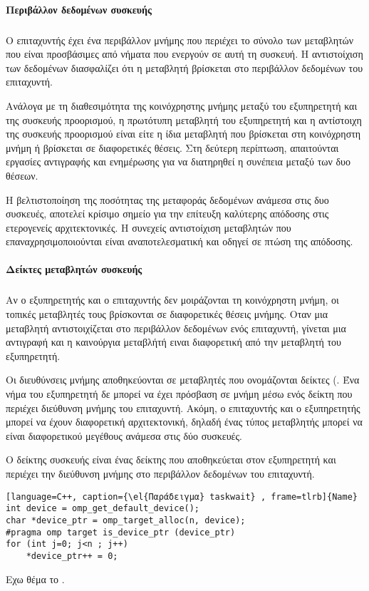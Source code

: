 \paragraph{Περιβάλλον δεδομένων συσκευής}
\subparagraph{}
Ο επιταχυντής έχει ένα περιβάλλον μνήμης που περιέχει το σύνολο των μεταβλητών που είναι προσβάσιμες από νήματα που ενεργούν σε αυτή τη συσκευή. Η αντιστοίχιση των δεδομένων \emph{} διασφαλίζει ότι η μεταβλητή βρίσκεται στο περιβάλλον δεδομένων του επιταχυντή.

Ανάλογα με τη διαθεσιμότητα της κοινόχρηστης μνήμης μεταξύ του εξυπηρετητή \emph{} και της συσκευής προορισμού, η πρωτότυπη μεταβλητή του εξυπηρετητή και η αντίστοιχη της συσκευής προορισμού είναι είτε η ίδια μεταβλητή που βρίσκεται στη κοινόχρηστη μνήμη ή βρίσκεται σε διαφορετικές θέσεις. Στη δεύτερη περίπτωση, απαιτούνται εργασίες αντιγραφής και ενημέρωσης για να διατηρηθεί η συνέπεια μεταξύ των δυο θέσεων.

Η βελτιστοποίηση της ποσότητας της μεταφοράς δεδομένων ανάμεσα στις δυο συσκευές, αποτελεί κρίσιμο σημείο για την επίτευξη καλύτερης απόδοσης στις ετερογενείς αρχιτεκτονικές.
Η συνεχείς αντιστοίχιση μεταβλητών που επαναχρησιμοποιούνται είναι αναποτελεσματική και οδηγεί σε πτώση της απόδοσης.

\paragraph{Δείκτες μεταβλητών συσκευής}
\subparagraph{}
Αν ο εξυπηρετητής και ο επιταχυντής δεν μοιράζονται τη κοινόχρηστη μνήμη, οι τοπικές μεταβλητές τους βρίσκονται σε διαφορετικές θέσεις μνήμης. Οταν μια μεταβλητή αντιστοιχίζεται στο περιβάλλον δεδομένων ενός επιταχυντή, γίνεται μια αντιγραφή και η καινούργια μεταβλήτή ειναι διαφορετική από την μεταβλητή του εξυπηρετητή.

Οι διευθύνσεις μνήμης αποθηκεύονται σε μεταβλητές που ονομάζονται δείκτες (\emph{}. Ένα νήμα του εξυπηρετητή δε μπορεί να έχει πρόσβαση σε μνήμη μέσω ενός δείκτη που περιέχει διεύθυνση μνήμης του επιταχυντή. Ακόμη, ο επιταχυντής και ο εξυπηρετητής μπορεί να έχουν διαφορετική αρχιτεκτονική, δηλαδή ένας τύπος μεταβλητής μπορεί να είναι διαφορετικού μεγέθους ανάμεσα στις δύο συσκευές.

Ο δείκτης συσκευής \emph{} είναι ένας δείκτης που αποθηκεύεται στον εξυπηρετητή και περιέχει την διεύθυνση μνήμης στο περιβάλλον δεδομένων του επιταχυντή.


\begin{lstlisting}[language=C++, caption={\el{Παράδειγμα} taskwait} , frame=tlrb]{Name}
int device = omp_get_default_device();
char *device_ptr = omp_target_alloc(n, device);
#pragma omp target is_device_ptr (device_ptr)
for (int j=0; j<n ; j++)
	*device_ptr++ = 0;
\end{lstlisting}
Εχω θέμα το .
\clearpage


